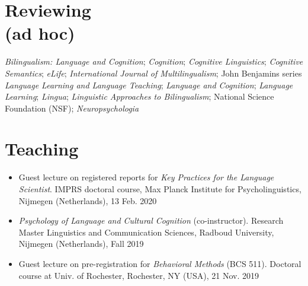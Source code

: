 \documentclass[margin, 11pt]{res} %
\begin{document}
\begin{resume}







\section{\sc Reviewing\\(ad hoc)}

\textit{Bilingualism: Language and Cognition};
\textit{Cognition};
\textit{Cognitive Linguistics};
\textit{Cognitive Semantics};
\textit{eLife};
\textit{International Journal of Multilingualism};
John Benjamins series \textit{Language Learning and Language Teaching};
\textit{Language and Cognition};
\textit{Language Learning};
\textit{Lingua};
\textit{Linguistic Approaches to Bilingualism};
National Science Foundation (NSF);
\textit{Neuropsychologia}






\section{\sc Teaching}

\begin{itemize}

\item Guest lecture on registered reports for \textit{Key Practices for the Language Scientist}. IMPRS doctoral course, Max Planck Institute for Psycholinguistics, Nijmegen (Netherlands), 13 Feb. 2020

\item \textit{Psychology of Language and Cultural Cognition} (co-instructor). Research Master Linguistics and Communication Sciences, Radboud University, Nijmegen (Netherlands), Fall 2019

\item Guest lecture on pre-registration for \textit{Behavioral Methods} (BCS 511). Doctoral course at Univ. of Rochester, Rochester, NY (USA), 21 Nov. 2019


\end{itemize}
\end{resume}
\end{document}
